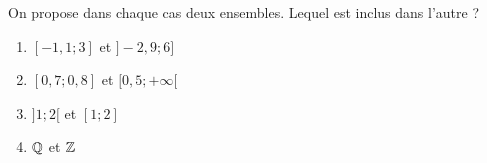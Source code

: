 
On propose dans chaque cas deux ensembles. Lequel est inclus dans l'autre ?  

\begin{enumerate}
\item $[-1,1;3]$ et $]-2,9;6]$
\item $[0,7;0,8]$ et $[0,5;+\infty[$
\item $]1;2[$ et $[1;2]$
\item $\mathbb Q$ et $\mathbb Z$
\end{enumerate}